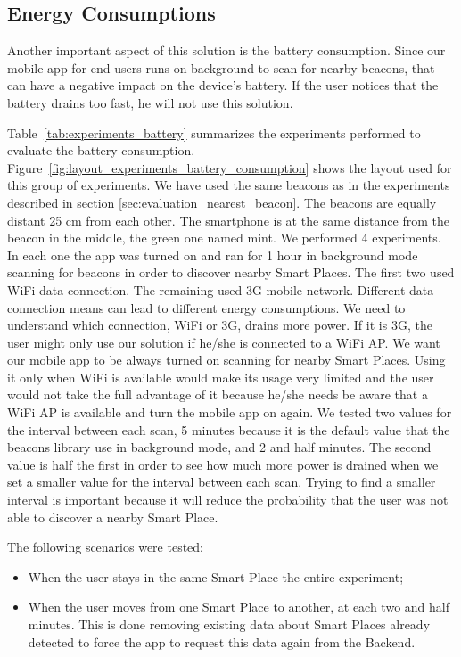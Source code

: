 \subsection{Energy Consumptions}
\label{sub:evaluation_energy_consumptions}
Another important aspect of this solution is the battery consumption.
Since our mobile app for end users runs on background to scan for nearby beacons, that can have a negative impact on the device's battery. If the user notices that the battery drains too fast, he will not use this solution.

Table~\ref{tab:experiments_battery} summarizes the experiments performed to evaluate the battery consumption.
Figure~\ref{fig:layout_experiments_battery_consumption} shows the layout used for this group of experiments.
We have used the same beacons as in the experiments described in section \ref{sec:evaluation_nearest_beacon}.
The beacons are equally distant 25 cm from each other.
The smartphone is at the same distance from the beacon in the middle, the green one named mint.
We performed 4 experiments.
In each one the app was turned on and ran for 1 hour in background mode scanning for beacons in order to discover nearby Smart Places.
The first two used \gls{WiFi} data connection.
The remaining used \gls{3G} mobile network.
Different data connection means can lead to different energy consumptions.
We need to understand which connection, \gls{WiFi} or \gls{3G}, drains more power.
If it is \gls{3G}, the user might only use our solution if he/she is connected to a \gls{WiFi} \gls{AP}.
We want our mobile app to be always turned on scanning for nearby Smart Places.
Using it only when \gls{WiFi} is available would make its usage very limited and the user would not take the full advantage of it because he/she needs be aware that a \gls{WiFi} \gls{AP} is available and turn the mobile app on again.
We tested two values for the interval between each scan, 5 minutes because it is the default value that the beacons library use in background mode, and 2 and half minutes.
The second value is half the first in order to see how much more power is drained when we set a smaller value for the interval between each scan.
Trying to find a smaller interval is important because it will reduce the probability that the user was not able to discover a nearby Smart Place.

The following scenarios were tested:
\begin{itemize}
  \item
  When the user stays in the same Smart Place the entire experiment;
  \item
  When the user moves from one Smart Place to another, at each two and half minutes.
  This is done removing existing data about Smart Places already detected to force the app to request this data again from the Backend.
\end{itemize}

